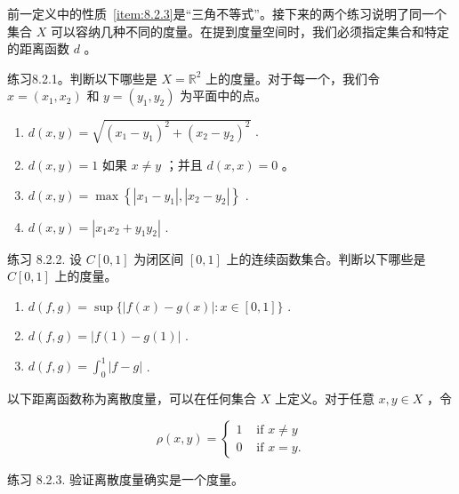 前一定义中的性质~\ref{item:8.2.3}是“三角不等式”。接下来的两个练习说明了同一个集合 \(X\) 可以容纳几种不同的度量。在提到度量空间时，我们必须指定集合和特定的距离函数 \(d\) 。

练习8.2.1。判断以下哪些是 \(X = {\mathbb{R}}^{2}\) 上的度量。对于每一个，我们令 \(x = \left( {{x}_{1},{x}_{2}}\right)\) 和 \(y = \left( {{y}_{1},{y}_{2}}\right)\) 为平面中的点。
\begin{enumerate}[label = (\alph*)]
\item \(d\left( {x,y}\right)  = \sqrt{{\left( {x}_{1} - {y}_{1}\right) }^{2} + {\left( {x}_{2} - {y}_{2}\right) }^{2}}\) .

\item  \(d\left( {x,y}\right)  = 1\) 如果 \(x \neq  y\) ；并且 \(d\left( {x,x}\right)  = 0\) 。

\item  \(d\left( {x,y}\right)  = \max \left\{  {\left| {{x}_{1} - {y}_{1}}\right| ,\left| {{x}_{2} - {y}_{2}}\right| }\right\}\) .

\item  \(d\left( {x,y}\right)  = \left| {{x}_{1}{x}_{2} + {y}_{1}{y}_{2}}\right|\) .
\end{enumerate}


练习 8.2.2. 设 \(C\left\lbrack  {0,1}\right\rbrack\) 为闭区间 \(\left\lbrack  {0,1}\right\rbrack\) 上的连续函数集合。判断以下哪些是 \(C\left\lbrack  {0,1}\right\rbrack\) 上的度量。
\begin{enumerate}[label = (\alph*)]
\item \(d\left( {f,g}\right)  = \sup \{ \left| {f\left( x\right)  - g\left( x\right) }\right|  : x \in  \left\lbrack  {0,1}\right\rbrack  \}\) .

\item  \(d\left( {f,g}\right)  = \left| {f\left( 1\right)  - g\left( 1\right) }\right|\) .

 
\item \(d\left( {f,g}\right)  = {\int }_{0}^{1}\left| {f - g}\right|\) .
\end{enumerate}


以下距离函数称为离散度量，可以在任何集合 \(X\) 上定义。对于任意 \(x,y \in  X\) ，令

\[
\rho \left( {x,y}\right)  = \left\{  \begin{array}{ll} 1 & \text{ if }x \neq  y \\  0 & \text{ if }x = y. \end{array}\right.
\]

练习 8.2.3. 验证离散度量确实是一个度量。

